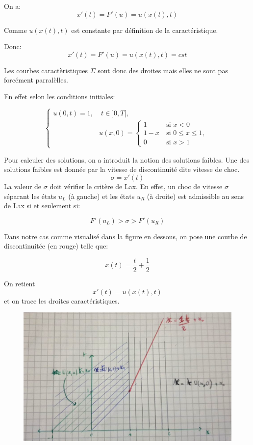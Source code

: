 On a: $$x'(t) = F'(u) = u(x(t),t)$$

Comme $u(x(t),t)$ est constante par d\'efinition de la caract\'eristique.

Donc: $$x'(t) = F'(u) = u(x(t),t)= cst$$

Les courbes caract\`eristiques $\Sigma$ sont donc des droites mais elles ne sont pas forc\'ement parral\`elles.

En effet selon les conditions initiales:

\begin{equation}
\label{systeme}
\left \lbrace \begin{array}{rl}
u(0,t) = 1, & \; t \in ]0,T[, \\
& u(x,0) =
\left \lbrace \begin{array}{rl}
1 & ~\text{si }  x < 0\\
1-x & ~\text{si }  0 \leq x \leq 1, \\
0 & ~\text{si }  x > 1
\end{array}\right.
\end{array}\right.
\end{equation}

Pour calculer des solutions, on a introduit la notion des solutions faibles. Une des solutions faibles est donn\'ee par la vitesse de discontinuit\'e dite vitesse de choc.
$$\sigma = x'(t)$$
La valeur de $\sigma$ doit v\'erifier le crit\`ere de Lax. En effet, un choc de vitesse $\sigma$ s\'eparant les \'etats $u_L$ (\`a gauche) et les \'etats $u_R$ (\`a droite) est admissible au sens de Lax si et seulement si:

$$F'(u_L) > \sigma > F'(u_R)$$

Dans notre cas comme visualis\'e dans la figure en dessous, on pose une courbe de discontinuit\'ee (en rouge) telle que:

$$x(t) = \frac{t}{2} + \frac{1}{2}$$

On retient $$x'(t) = u(x(t),t)$$ et on trace les droites caract\'eristiques.

\begin{figure}[h!]
	\centering \includegraphics[scale=0.4]{Images_Fichiers/Y6.png}
\end{figure}

